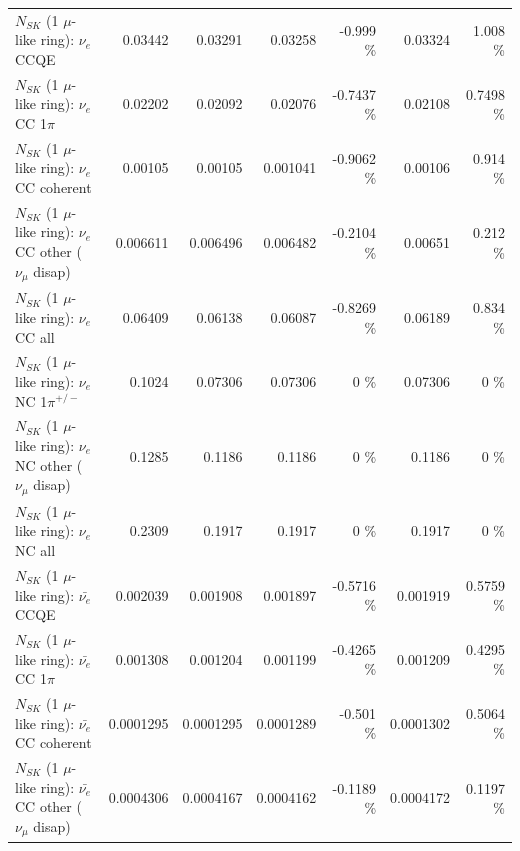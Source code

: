 \begin{table}
\begin{tabular}{| l | r | r | r  r | r  r |}
\hline
\hline
\hline
                                      $N_{SK}$ (1 $\mu$-like ring): $\nu_e$ CCQE &         0.03442 &         0.03291 &         0.03258 &   -0.999 \%  &         0.03324 &    1.008 \%  \\ 
                                 $N_{SK}$ (1 $\mu$-like ring): $\nu_e$ CC 1$\pi$ &         0.02202 &         0.02092 &         0.02076 &  -0.7437 \%  &         0.02108 &   0.7498 \%  \\ 
                               $N_{SK}$ (1 $\mu$-like ring): $\nu_e$ CC coherent &         0.00105 &         0.00105 &        0.001041 &  -0.9062 \%  &         0.00106 &    0.914 \%  \\ 
                $N_{SK}$ (1 $\mu$-like ring): $\nu_e$ CC other ($\nu_\mu$ disap) &        0.006611 &        0.006496 &        0.006482 &  -0.2104 \%  &         0.00651 &    0.212 \%  \\ 
                                  $N_{SK}$ (1 $\mu$-like ring): $\nu_{e}$ CC all &         0.06409 &         0.06138 &         0.06087 &  -0.8269 \%  &         0.06189 &    0.834 \%  \\ 
\hline
                           $N_{SK}$ (1 $\mu$-like ring): $\nu_e$ NC 1$\pi^{+/-}$ &          0.1024 &         0.07306 &         0.07306 &        0 \%  &         0.07306 &        0 \%  \\ 
                $N_{SK}$ (1 $\mu$-like ring): $\nu_e$ NC other ($\nu_\mu$ disap) &          0.1285 &          0.1186 &          0.1186 &        0 \%  &          0.1186 &        0 \%  \\ 
                                  $N_{SK}$ (1 $\mu$-like ring): $\nu_{e}$ NC all &          0.2309 &          0.1917 &          0.1917 &        0 \%  &          0.1917 &        0 \%  \\ 
\hline
\hline
\hline
                                $N_{SK}$ (1 $\mu$-like ring): $\bar{\nu_e}$ CCQE &        0.002039 &        0.001908 &        0.001897 &  -0.5716 \%  &        0.001919 &   0.5759 \%  \\ 
                           $N_{SK}$ (1 $\mu$-like ring): $\bar{\nu_e}$ CC 1$\pi$ &        0.001308 &        0.001204 &        0.001199 &  -0.4265 \%  &        0.001209 &   0.4295 \%  \\ 
                         $N_{SK}$ (1 $\mu$-like ring): $\bar{\nu_e}$ CC coherent &       0.0001295 &       0.0001295 &       0.0001289 &   -0.501 \%  &       0.0001302 &   0.5064 \%  \\ 
          $N_{SK}$ (1 $\mu$-like ring): $\bar{\nu_e}$ CC other ($\nu_\mu$ disap) &       0.0004306 &       0.0004167 &       0.0004162 &  -0.1189 \%  &       0.0004172 &   0.1197 \%  \\ 

\end{tabular}
\end{table}
